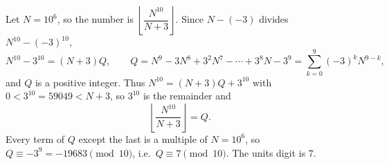 Let $N=10^6$, so the number is $\left\lfloor\dfrac{N^{10}}{N+3}\right\rfloor$. Since $N-(-3)$ divides $N^{10}-(-3)^{10}$,
\[
N^{10}-3^{10}=(N+3)Q,\qquad Q=N^9-3N^8+3^2N^7-\cdots+3^8N-3^9=\sum_{k=0}^{9}(-3)^kN^{9-k},
\]
and $Q$ is a positive integer. Thus $N^{10}=(N+3)Q+3^{10}$ with $0<3^{10}=59049<N+3$, so $3^{10}$ is the remainder and
\[
\left\lfloor\dfrac{N^{10}}{N+3}\right\rfloor=Q .
\]
Every term of $Q$ except the last is a multiple of $N=10^6$, so $Q\equiv-3^9=-19683\pmod{10}$, i.e.\ $Q\equiv7\pmod{10}$. The units digit is $\boxed{7}$.
